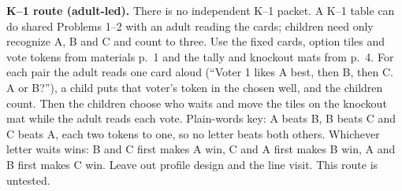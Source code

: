 \textbf{K--1 route (adult-led).}
There is no independent K--1 packet. A K--1 table can do shared Problems 1--2 with an adult reading the cards; children need only recognize A, B and C and count to three. Use the fixed cards, option tiles and vote tokens from materials p.~1 and the tally and knockout mats from p.~4. For each pair the adult reads one card aloud (``Voter 1 likes A best, then B, then C. A or B?''), a child puts that voter's token in the chosen well, and the children count. Then the children choose who waits and move the tiles on the knockout mat while the adult reads each vote. Plain-words key: A beats B, B beats C and C beats A, each two tokens to one, so no letter beats both others. Whichever letter waits wins: B and C first makes A win, C and A first makes B win, A and B first makes C win. Leave out profile design and the line visit. This route is untested.
